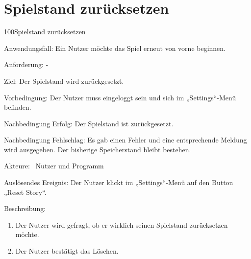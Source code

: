 \section{Spielstand zurücksetzen}
\begin{function}{100}{Spielstand zurücksetzen}
\item[Anwendungsfall:] Ein Nutzer möchte das Spiel erneut von vorne beginnen.
\item[Anforderung:] -
\item[Ziel:] Der Spielstand wird zurückgesetzt.
\item[Vorbedingung:] Der Nutzer muss eingeloggt sein und sich im „Settings“-Menü befinden.
\item[Nachbedingung Erfolg:]  Der Spielstand ist zurückgesetzt.
\item[Nachbedingung Fehlschlag:] Es gab einen Fehler und eine entsprechende Meldung wird ausgegeben. Der bisherige Speicherstand bleibt bestehen.
\item[Akteure:] ~Nutzer und Programm
\item[Auslösendes Ereignis:] Der Nutzer klickt im „Settings“-Menü auf den Button „Reset Story“.
\item[Beschreibung:] ~
\begin{enumerate}
  \item  Der Nutzer wird gefragt, ob er wirklich seinen Spielstand zurücksetzen möchte.
  \item  Der Nutzer bestätigt das Löschen.
\end{enumerate}
\end{function}

